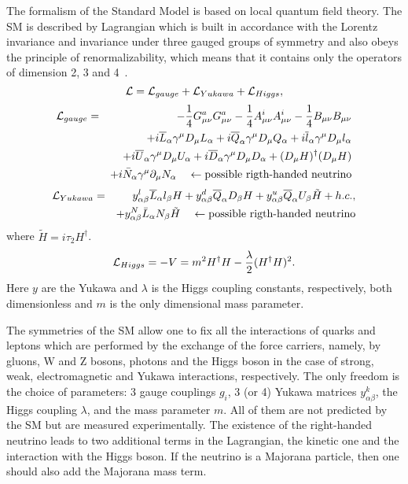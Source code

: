 \documentclass{cernyrep}
\begin{document}
The formalism of the Standard Model is based on local quantum field theory. The SM is described by Lagrangian which is built in accordance with the Lorentz invariance and invariance under three gauged groups of symmetry and also obeys the principle of renormalizability, which means that it contains only the operators of dimension 2, 3 and 4~\cite{PDG}. 
\begin{equation}
{\cal L} ={\cal L}_{gauge} + {\cal L}_{Yukawa} + {\cal L}_{Higgs},
 \end{equation}
\begin{eqnarray*}
{\cal L}_{gauge} & = & -\frac{1}{4} G_{\mu\nu}^aG_{\mu\nu}^a - \frac{1}{4} A_{\mu\nu}^iA_{\mu\nu}^i
-\frac{1}{4} B_{\mu\nu}B_{\mu\nu}\\
 & &  + i\overline{L}_{\alpha}\gamma^{\mu}D_{\mu}L_{\alpha}
+ i\overline{Q}_{\alpha}\gamma^{\mu}D_{\mu}Q_{\alpha} + i\overline{l}_{\alpha}
\gamma^{\mu}D_{\mu}l_{\alpha}\\
 & &  + i\overline{U}_{\alpha}\gamma^{\mu}D_{\mu}U_{
\alpha} + i\overline{D}_{\alpha}\gamma^{\mu}D_{\mu}D_{\alpha} + (D_{\mu}H)^{\dagger}
(D_{\mu}H)\\
&& + i \bar N_\alpha\gamma^\mu\partial_\mu N_\alpha \ \ \  \leftarrow \mbox{possible  rigth-handed neutrino}
\end{eqnarray*}
\begin{eqnarray*}
{\cal L}_{Yukawa} &=& y_{\alpha\beta}^l\overline{L}_{\alpha}l_{\beta}H + y_{\alpha
\beta}^d\overline{Q}_{\alpha}D_{\beta}H + y_{\alpha\beta}^u\overline{Q}_{\alpha}
U_{\beta}\tilde{H} + h.c.,\\
&&+ y^N_{\alpha\beta}\bar L_\alpha N_\beta \tilde H \ \ \  \leftarrow \mbox{possible  rigth-handed neutrino}
\end{eqnarray*}
where $\tilde{H}=i\tau_2H^{\dagger}$.
$${\cal L}_{Higgs} = - V = m^2H^{\dagger}H - \frac{\lambda}{2}(H^{\dagger}H)^2.$$
Here $y$ are the Yukawa and $\lambda$ is the Higgs coupling constants, respectively,
both dimensionless and $m$ is the only dimensional mass parameter.

The symmetries of the SM allow one to fix all the interactions of quarks and leptons which are performed by the exchange of the force carriers, namely, by gluons, W and Z bosons, photons and the Higgs boson in the case of strong, weak, electromagnetic and Yukawa interactions, respectively. The only freedom is the choice of parameters: 3 gauge couplings $g_i$, 3 (or 4) Yukawa matrices $y^k_{\alpha\beta}$, the Higgs coupling $\lambda$, and the mass parameter $m$. All of them are not predicted by the SM but are measured experimentally. The existence of the right-handed neutrino leads to two additional terms in the Lagrangian, the kinetic one and the interaction with the Higgs boson. If the neutrino is a Majorana particle, then one should also add the Majorana mass term.
\end{document}
